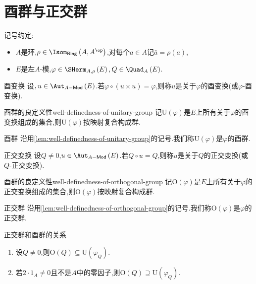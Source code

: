 \section{酉群与正交群}

记号约定:
\begin{itemize}
	\item $A$是环,$\rho\in\Isom_{\mathsf{Ring}}\left(A,A^{\op}\right)$,对每个$a\in A$记$\bar{a}=\rho\left(a\right)$,
	\item $E$是左$A$-模,$\varphi\in\SHerm_{A,\rho}\left(E\right),Q\in\Quad_{A}\left(E\right)$.
\end{itemize}

\begin{definition}{酉变换}{}
	设$,u\in\Aut_{A-\mathsf{Mod}}\left(E\right)$.若$\varphi\circ\left(u\times u\right)=\varphi$,则称$u$是关于$\varphi$的酉变换(或$\varphi$-酉变换).
\end{definition}

\begin{lemma}{酉群的良定义性}{well-definedness-of-unitary-group}
	记$\mathrm{U}\left(\varphi\right)$是$E$上所有关于$\varphi$的酉变换组成的集合,则$\mathrm{U}\left(\varphi\right)$按映射复合构成群.
\end{lemma}

\begin{definition}{酉群}{}
	沿用\cref{lem:well-definedness-of-unitary-group}的记号.我们称$\mathrm{U}\left(\varphi\right)$是$\varphi$的酉群.
\end{definition}

\begin{definition}{正交变换}{}
	设$Q\neq 0$,$u\in\Aut_{A-\mathsf{Mod}}\left(E\right)$.若$Q\circ u=Q$,则称$u$是关于$Q$的正交变换(或$Q$-正交变换).
\end{definition}

\begin{lemma}{酉群的良定义性}{well-definedness-of-orthogonal-group}
	记$\mathrm{O}\left(\varphi\right)$是$E$上所有关于$\varphi$的正交变换组成的集合,则$\mathrm{O}\left(\varphi\right)$按映射复合构成群.
\end{lemma}

\begin{definition}{正交群}{}
	沿用\cref{lem:well-definedness-of-orthogonal-group}的记号.我们称$\mathrm{O}\left(\varphi\right)$是$\varphi$的正交群.
\end{definition}

\begin{remark}{正交群和酉群的关系}{}
	\begin{enumerate}
		\item 设$Q\neq 0$,则$\mathrm{O}\left(Q\right)\subseteq\mathrm{U}\left(\varphi_{Q}\right)$.
		\item 若$2\cdot 1_{A}\neq 0$且不是$A$中的零因子,则$\mathrm{O}\left(Q\right)\supseteq\mathrm{U}\left(\varphi_{Q}\right)$.
	\end{enumerate}
\end{remark}

